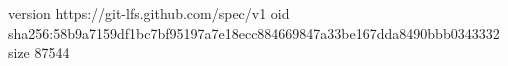 version https://git-lfs.github.com/spec/v1
oid sha256:58b9a7159df1bc7bf95197a7e18ecc884669847a33be167dda8490bbb0343332
size 87544
